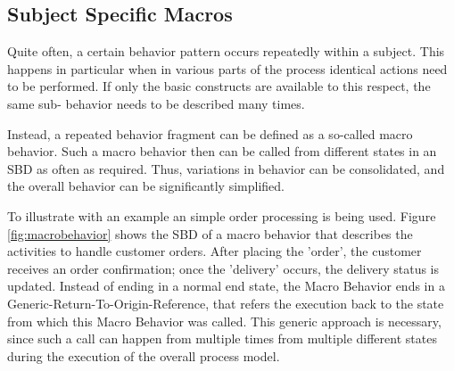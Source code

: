 


\subsection{Subject Specific Macros}

Quite often, a certain behavior pattern occurs repeatedly within a subject. This happens in particular when in various parts of the process identical actions need to be performed. If only the basic constructs are available to this respect, the same sub- behavior needs to be described many times.

Instead, a repeated behavior fragment can be defined as a so-called macro behavior. Such a macro behavior then can be called from different states in an SBD as often as required. Thus, variations in behavior can be consolidated, and the overall behavior can be significantly simplified.

To illustrate with an example an simple order processing is being used. Figure \ref{fig:macrobehavior} shows the SBD of a macro behavior that describes the activities to handle customer orders. After placing the 'order', the customer receives an order confirmation; once the 'delivery' occurs, the delivery status is updated. Instead of ending in a normal end state, the Macro Behavior ends in a Generic-Return-To-Origin-Reference, that refers the execution back to the state from which this Macro Behavior was called. This generic approach is necessary, since such a call can happen from multiple times from multiple different states during the execution of the overall process model. 

